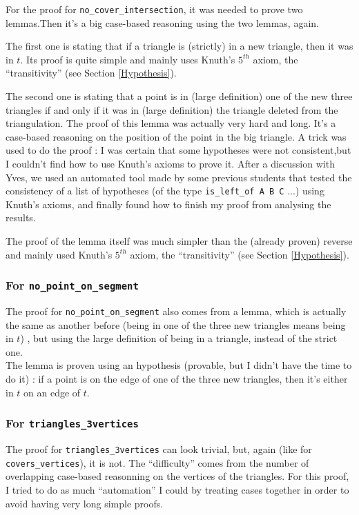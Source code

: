 \documentclass[a4paper,10pt]{article}
\begin{document}
  For the proof for {\tt no\_cover\_intersection}, it was needed to prove two lemmas.Then it's a big case-based reasoning using the two lemmas, again.

  The first one is stating that if a triangle is (strictly) in a new triangle, then it was in $t$.
  Its proof is quite simple and mainly uses Knuth's $5^{th}$ axiom, the ``transitivity'' (see Section \ref{Hypothesis}).
  
  The second one is stating that a point is in (large definition) one of the new three triangles if and only if it was in (large definition) the triangle deleted from the triangulation. The proof of this lemma was actually very hard and long. It's a case-based reasoning on the position of the point in the big triangle. A trick was used to do the proof : I was certain that some hypotheses were not consistent,but I couldn't find how to use Knuth's axioms to prove it. After a discussion with Yves, we used an automated tool made by some previous students that tested the consistency of a list of hypotheses (of the type {\tt is\_left\_of A B C} ...) using Knuth's axioms, and finally found how to finish my proof from analysing the results.

  
  
  The proof of the lemma itself was much simpler than the (already proven) reverse and mainly used Knuth's $5^{th}$ axiom, the ``transitivity'' (see Section \ref{Hypothesis}).
  
  \subsubsection{For {\tt no\_point\_on\_segment}}

  The proof for {\tt no\_point\_on\_segment} also comes from a lemma, which is actually the same as another before (being in one of the three new triangles means being in $t$) , but using the large definition of being in a triangle, instead of the strict one.\\
  The lemma is proven using an hypothesis (provable, but I didn't have the time to do it) : if a point is on the edge of one of the three new triangles, then it's either in $t$ on an edge of $t$.
  
  \subsubsection{For {\tt triangles\_3vertices}}

  The proof for {\tt triangles\_3vertices} can look trivial, but, again (like for {\tt covers\_vertices}), it is not. The ``difficulty'' comes from the number of overlapping case-based reasonning on the vertices of the triangles. For this proof, I tried to do as much ``automation'' I could by treating cases together in order to avoid having very long simple proofs.
  
\end{document}
